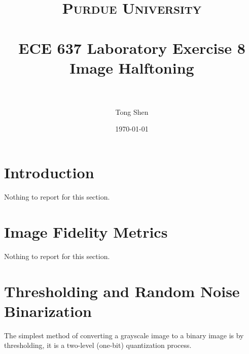 \documentclass[paper=a4, fontsize=11pt]{scrartcl} %
\title{	
\normalfont \normalsize 
\textsc{Purdue University} \\ [25pt] %
\horrule{0.5pt} \\[0.4cm] %
\huge ECE 637 Laboratory Exercise 8\\ 
\huge Image Halftoning\\%
\horrule{2pt} \\[0.5cm] %
}
\author{Tong Shen} %
\date{\normalsize\today} %
\numberwithin{equation}{section} %
\numberwithin{figure}{section} %
\numberwithin{table}{section} %
\begin{document}
\maketitle %

\section{Introduction}
Nothing to report for this section. 

\section{Image Fidelity Metrics}
Nothing to report for this section. 

\section{Thresholding and Random Noise Binarization
}

The simplest method of converting a grayscale image to a binary image is by thresholding, it is a two-level (one-bit) quantization process. 
\end{document}
